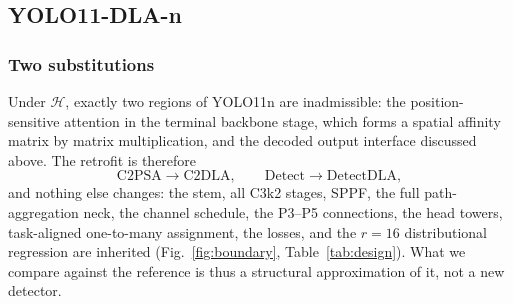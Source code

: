 \subsection{YOLO11-DLA-n}
\label{sec:retrofit}



\subsubsection{Two substitutions}
Under $\mathcal{H}$, exactly two regions of YOLO11n are inadmissible: the
position-sensitive attention in the terminal backbone stage, which forms a
spatial affinity matrix by matrix multiplication, and the decoded output
interface discussed above. The retrofit is therefore
\begin{equation}
\mathrm{C2PSA}\rightarrow\mathrm{C2DLA},\qquad
\mathrm{Detect}\rightarrow\mathrm{DetectDLA},
\label{eq:substitutions}
\end{equation}
and nothing else changes: the stem, all C3k2 stages, SPPF, the full
path-aggregation neck, the channel schedule, the P3--P5 connections, the head
towers, task-aligned one-to-many assignment, the losses, and the $r=16$
distributional regression \cite{li2020gfl} are inherited (Fig.~\ref{fig:boundary},
Table~\ref{tab:design}). What we compare against the reference is thus a
structural approximation of it, not a new detector.

